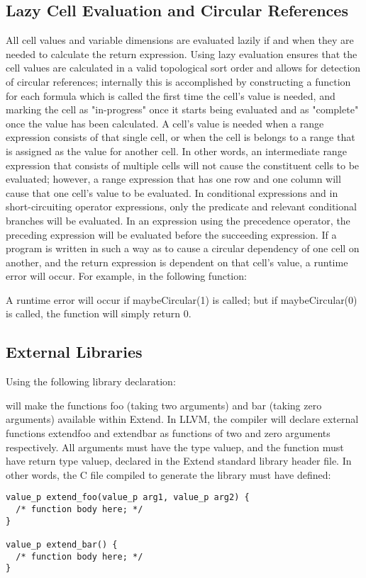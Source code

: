 \subsection{Lazy Cell Evaluation and Circular References}
All cell values and variable dimensions are evaluated lazily if and when they are needed to calculate the return expression. Using lazy evaluation ensures that the cell values are calculated in a valid topological sort order and allows for detection of circular references; internally this is accomplished by constructing a function for each formula which is called the first time the cell's value is needed, and marking the cell as "in-progress" once it starts being evaluated and as "complete" once the value has been calculated. A cell's value is needed when a range expression consists of that single cell, or when the cell is belongs to a range that is assigned as the value for another cell. In other words, an intermediate range expression that consists of multiple cells will not cause the constituent cells to be evaluated; however, a range expression that has one row and one column will cause that one cell's value to be evaluated. In conditional expressions and in short-circuiting operator expressions, only the predicate and relevant conditional branches will be evaluated. In an expression using the precedence operator, the preceding expression will be evaluated before the succeeding expression.
If a program is written in such a way as to cause a circular dependency of one cell on another, and the return expression is dependent on that cell's value, a runtime error will occur. For example, in the following function:

A runtime error will occur if maybeCircular(1) is called; but if maybeCircular(0) is called, the function will simply return 0.
\subsection{External Libraries}
\label{sec:ExternFunctionSignatures}
Using the following library declaration:

will make the functions foo (taking two arguments) and bar (taking zero arguments) available within Extend. In LLVM, the compiler will declare external functions extend\textunderscore foo and extend\textunderscore bar as functions of two and zero arguments respectively. All arguments must have the type value\textunderscore p, and the function must have return type value\textunderscore p, declared in the Extend standard library header file. In other words, the C file compiled to generate the library must have defined:
\begin{lstlisting}
value_p extend_foo(value_p arg1, value_p arg2) {
  /* function body here; */
}

value_p extend_bar() {
  /* function body here; */
}
\end{lstlisting}
